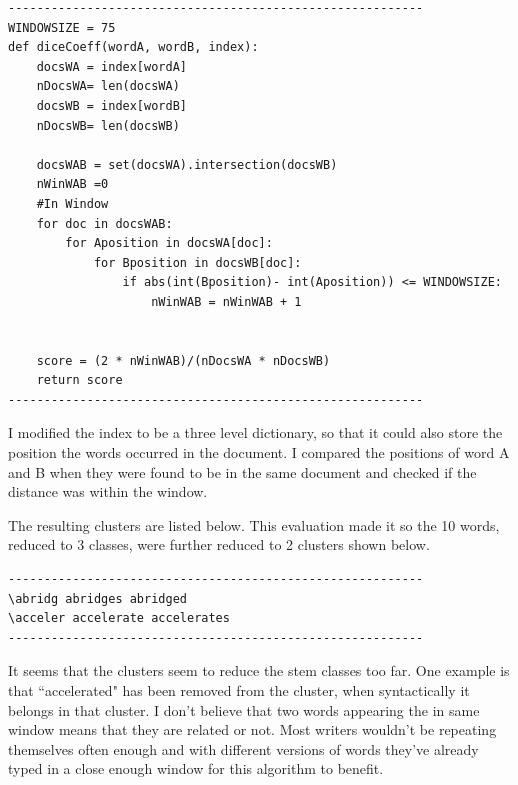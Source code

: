 \documentclass[letterpaper,12pt]{article}
\begin{document}
\begin{lstlisting}[breaklines]
----------------------------------------------------------
WINDOWSIZE = 75
def diceCoeff(wordA, wordB, index):
    docsWA = index[wordA]
    nDocsWA= len(docsWA)
    docsWB = index[wordB]
    nDocsWB= len(docsWB)
        
    docsWAB = set(docsWA).intersection(docsWB)
    nWinWAB =0
    #In Window
    for doc in docsWAB:
        for Aposition in docsWA[doc]:
            for Bposition in docsWB[doc]:
                if abs(int(Bposition)- int(Aposition)) <= WINDOWSIZE:
                    nWinWAB = nWinWAB + 1
    

    score = (2 * nWinWAB)/(nDocsWA * nDocsWB)
    return score
----------------------------------------------------------
\end{lstlisting}

I modified the index to be a three level dictionary, so that it could also store the position the words occurred in the document. I compared the positions of word A and B when they were found to be in the same document and checked if the distance was within the window. 

The resulting clusters are listed below. This evaluation made it so the 10 words, reduced to 3 classes, were further reduced to 2 clusters shown below.

 \begin{lstlisting}[breaklines]
----------------------------------------------------------
\abridg abridges abridged 
\acceler accelerate accelerates 
----------------------------------------------------------
\end{lstlisting}

It seems that the clusters seem to reduce the stem classes too far. One example is that ``accelerated" has been removed from the cluster, when syntactically it belongs in that cluster. I don't believe that two words appearing the in same window means that they are related or not. Most writers wouldn't be repeating themselves often enough and with different versions of words they've already typed in a close enough window for this algorithm to benefit.

\pagebreak
\end{document}
